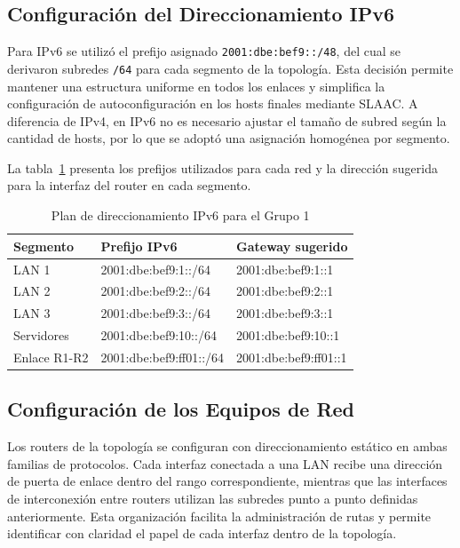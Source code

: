 \subsection{Configuración del Direccionamiento IPv6}

Para IPv6 se utilizó el prefijo asignado \texttt{2001:dbe:bef9::/48}, del cual se
derivaron subredes \texttt{/64} para cada segmento de la topología. Esta decisión
permite mantener una estructura uniforme en todos los enlaces y simplifica la
configuración de autoconfiguración en los hosts finales mediante SLAAC. A diferencia
de IPv4, en IPv6 no es necesario ajustar el tamaño de subred según la cantidad de
hosts, por lo que se adoptó una asignación homogénea por segmento.

La tabla~\ref{tab:ipv6} presenta los prefijos utilizados para cada red y la
dirección sugerida para la interfaz del router en cada segmento.

\begin{table}[H]
\centering
\caption{Plan de direccionamiento IPv6 para el Grupo 1}
\label{tab:ipv6}
\begin{tabularx}{\textwidth}{l l l}
\toprule
Segmento & Prefijo IPv6 & Gateway sugerido \\
\midrule
LAN 1 & 2001:dbe:bef9:1::/64 & 2001:dbe:bef9:1::1 \\
LAN 2 & 2001:dbe:bef9:2::/64 & 2001:dbe:bef9:2::1 \\
LAN 3 & 2001:dbe:bef9:3::/64 & 2001:dbe:bef9:3::1 \\
Servidores & 2001:dbe:bef9:10::/64 & 2001:dbe:bef9:10::1 \\
Enlace R1-R2 & 2001:dbe:bef9:ff01::/64 & 2001:dbe:bef9:ff01::1 \\
\bottomrule
\end{tabularx}
\end{table}

\subsection{Configuración de los Equipos de Red}

Los routers de la topología se configuran con direccionamiento estático en
ambas familias de protocolos. Cada interfaz conectada a una LAN recibe una
dirección de puerta de enlace dentro del rango correspondiente, mientras que
las interfaces de interconexión entre routers utilizan las subredes punto a
punto definidas anteriormente. Esta organización facilita la administración de
rutas y permite identificar con claridad el papel de cada interfaz dentro de la
topología.

